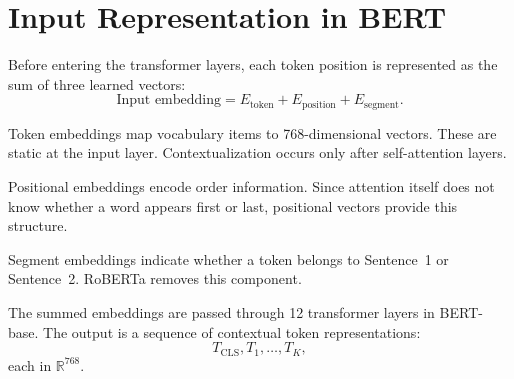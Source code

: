 \section{Input Representation in BERT}
\medskip

Before entering the transformer layers, each token position is represented as the sum of three learned vectors:
\[
\text{Input embedding}
=
E_{\text{token}}
+
E_{\text{position}}
+
E_{\text{segment}}.
\]

Token embeddings map vocabulary items to 768-dimensional vectors. These are static at the input layer. Contextualization occurs only after self-attention layers.

Positional embeddings encode order information. Since attention itself does not know whether a word appears first or last, positional vectors provide this structure.

Segment embeddings indicate whether a token belongs to Sentence~1 or Sentence~2. RoBERTa removes this component.

The summed embeddings are passed through 12 transformer layers in BERT-base. The output is a sequence of contextual token representations:
\[
T_{\text{CLS}}, T_1, \dots, T_K,
\]
each in $\mathbb{R}^{768}$.

\bigskip

